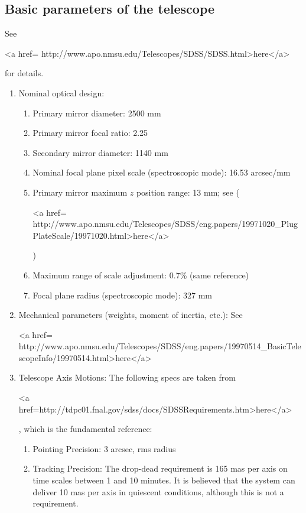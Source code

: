 \subsection{Basic parameters of the telescope}
See 
\begin{rawhtml}
<a href= http://www.apo.nmsu.edu/Telescopes/SDSS/SDSS.html>here</a>\end{rawhtml} for
details. 
\begin{enumerate}

\item Nominal optical design:
\begin{enumerate}
\item Primary mirror diameter: 2500 mm
\item Primary mirror focal ratio: 2.25
\item Secondary mirror diameter: 1140 mm
\item Nominal focal plane pixel scale (spectroscopic mode): 16.53 arcsec/mm
\item Primary mirror maximum $z$ position range: 13 mm; see 
(
\begin{rawhtml}
<a href= http://www.apo.nmsu.edu/Telescopes/SDSS/eng.papers/19971020_PlugPlateScale/19971020.html>here</a>\end{rawhtml})
\item Maximum range of scale adjustment: 0.7\% (same reference)
\item Focal plane radius (spectroscopic mode): 327 mm
\end{enumerate}

\item Mechanical parameters (weights, moment of inertia, etc.):\hfil\break
See 
\begin{rawhtml}
<a href= http://www.apo.nmsu.edu/Telescopes/SDSS/eng.papers/19970514_BasicTelescopeInfo/19970514.html>here</a>\end{rawhtml}

\item Telescope Axis Motions: \hfil\break
The following specs are taken from
\begin{rawhtml}
<a href=http://tdpc01.fnal.gov/sdss/docs/SDSSRequirements.htm>here</a>\end{rawhtml}, which is the
fundamental reference:
\begin{enumerate}
\item Pointing Precision: 3 arcsec, rms radius

\item Tracking Precision: The drop-dead requirement is 165 mas per
axis on time scales between 1 and 10 minutes.  It is believed that the
system can deliver 10 mas per axis in quiescent conditions, although
this is not a requirement.


\end{enumerate}
\end{enumerate}
